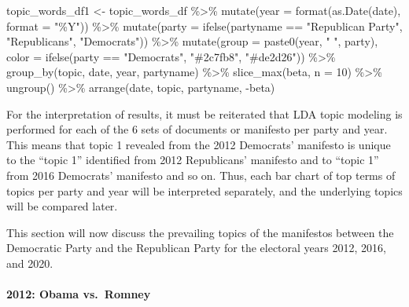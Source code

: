 \documentclass[
]{article}
\newenvironment{Shaded}{\begin{snugshade}}{\end{snugshade}}
\newcommand{\AttributeTok}[1]{\textcolor[rgb]{0.77,0.63,0.00}{#1}}
\newcommand{\DecValTok}[1]{\textcolor[rgb]{0.00,0.00,0.81}{#1}}
\newcommand{\FunctionTok}[1]{\textcolor[rgb]{0.00,0.00,0.00}{#1}}
\newcommand{\NormalTok}[1]{#1}
\newcommand{\OtherTok}[1]{\textcolor[rgb]{0.56,0.35,0.01}{#1}}
\newcommand{\SpecialCharTok}[1]{\textcolor[rgb]{0.00,0.00,0.00}{#1}}
\newcommand{\StringTok}[1]{\textcolor[rgb]{0.31,0.60,0.02}{#1}}
\begin{document}
\begin{Shaded}
\begin{Highlighting}[]
\NormalTok{topic\_words\_df1 }\OtherTok{\textless{}{-}}\NormalTok{ topic\_words\_df }\SpecialCharTok{\%\textgreater{}\%}
  \FunctionTok{mutate}\NormalTok{(}\AttributeTok{year =} \FunctionTok{format}\NormalTok{(}\FunctionTok{as.Date}\NormalTok{(date), }\AttributeTok{format =} \StringTok{"\%Y"}\NormalTok{)) }\SpecialCharTok{\%\textgreater{}\%}
  \FunctionTok{mutate}\NormalTok{(}\AttributeTok{party =} \FunctionTok{ifelse}\NormalTok{(partyname }\SpecialCharTok{==} \StringTok{"Republican Party"}\NormalTok{, }\StringTok{"Republicans"}\NormalTok{, }\StringTok{"Democrats"}\NormalTok{)) }\SpecialCharTok{\%\textgreater{}\%}
  \FunctionTok{mutate}\NormalTok{(}\AttributeTok{group =} \FunctionTok{paste0}\NormalTok{(year, }\StringTok{" "}\NormalTok{, party),}
         \AttributeTok{color =} \FunctionTok{ifelse}\NormalTok{(party }\SpecialCharTok{==} \StringTok{"Democrats"}\NormalTok{, }\StringTok{"\#2c7fb8"}\NormalTok{, }\StringTok{"\#de2d26"}\NormalTok{)) }\SpecialCharTok{\%\textgreater{}\%} 
  \FunctionTok{group\_by}\NormalTok{(topic, date, year, partyname) }\SpecialCharTok{\%\textgreater{}\%}
  \FunctionTok{slice\_max}\NormalTok{(beta, }\AttributeTok{n =} \DecValTok{10}\NormalTok{) }\SpecialCharTok{\%\textgreater{}\%} 
  \FunctionTok{ungroup}\NormalTok{() }\SpecialCharTok{\%\textgreater{}\%}
  \FunctionTok{arrange}\NormalTok{(date, topic, partyname, }\SpecialCharTok{{-}}\NormalTok{beta)}
\end{Highlighting}
\end{Shaded}

For the interpretation of results, it must be reiterated that LDA topic
modeling is performed for each of the 6 sets of documents or manifesto
per party and year. This means that topic 1 revealed from the 2012
Democrats' manifesto is unique to the ``topic 1'' identified from 2012
Republicans' manifesto and to ``topic 1'' from 2016 Democrats' manifesto
and so on. Thus, each bar chart of top terms of topics per party and
year will be interpreted separately, and the underlying topics will be
compared later.

This section will now discuss the prevailing topics of the manifestos
between the Democratic Party and the Republican Party for the electoral
years 2012, 2016, and 2020.

\hypertarget{obama-vs.-romney}{%
\paragraph{2012: Obama vs.~Romney}\label{obama-vs.-romney}}
\end{document}
